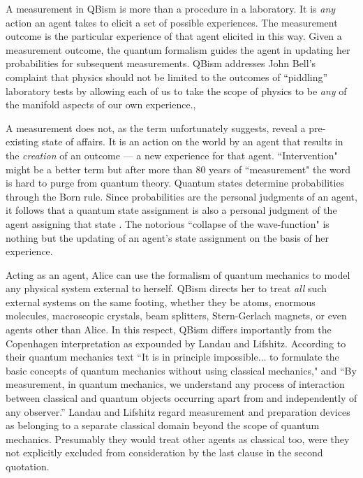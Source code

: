 \documentclass[aps,prb,superscriptaddress,12pt,tightenlines,nofootinbib]{revtex4-2}
\begin{document}
A measurement in QBism is more than a procedure in a laboratory.  It is {\it any} action an agent takes to elicit a set of possible experiences.   The measurement outcome is the particular experience of that agent elicited in this way. Given a measurement outcome, the quantum formalism guides the agent in updating her
probabilities for subsequent measurements.   QBism addresses John Bell's
complaint
that physics should not be limited to  the outcomes of ``piddling'' laboratory tests \cite{Bell90} by allowing each of us to take the scope of physics to be {\it any\/} of the manifold aspects of our own experience.,


A measurement does not, as the term unfortunately
suggests, reveal a pre-existing  state of affairs.   It is an action on the world by an agent that results in the {\it creation\/} of an outcome --- a new experience for that agent.  ``Intervention" might  be a better term \cite{Fuchs10b} but after more than 80 years of ``measurement" the word is hard to purge from quantum theory.
Quantum states determine probabilities through the Born rule.     Since probabilities are the personal judgments of an agent, it follows that a quantum state assignment is also a personal judgment of the agent assigning that state \cite{Caves02}.  The notorious ``collapse of the wave-function" is nothing but the updating of an agent's state assignment on the basis of her experience.

Acting as an agent, Alice can use the formalism of quantum mechanics to model any physical system external to herself.  QBism directs her to treat {\it all\/} such external systems on the same footing, whether they be atoms, enormous molecules, macroscopic crystals, beam splitters, Stern-Gerlach magnets,  or even agents other than Alice.   In this respect, QBism differs importantly from the Copenhagen interpretation as expounded by Landau and Lifshitz.  According to their quantum mechanics text \cite{Landau65}
``It is in principle impossible$\ldots$ to formulate the basic concepts
of quantum mechanics without using classical mechanics,"
and
``By measurement, in quantum mechanics, we understand any
process of interaction between classical and quantum objects
occurring apart from and independently of any observer.''
Landau and Lifshitz regard measurement and preparation devices as belonging to a separate classical domain beyond the scope of quantum mechanics. Presumably they would treat other agents as classical too, were they not explicitly excluded from consideration by the last clause in the second quotation.
\end{document}
